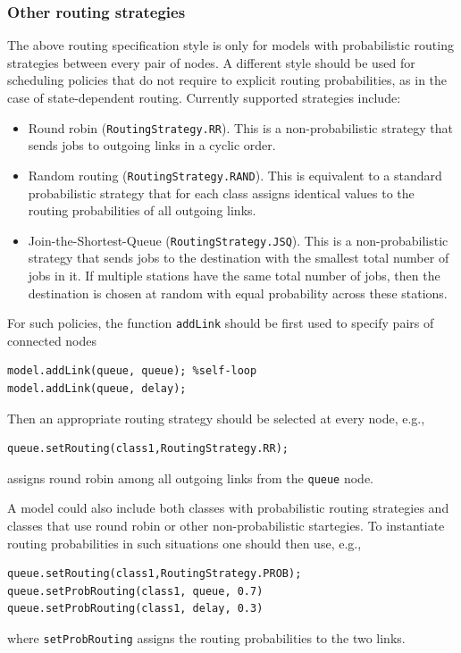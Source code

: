 \subsubsection{Other routing strategies}
The above routing specification style is only for models with probabilistic routing strategies between every pair of nodes. A different style should be used for scheduling policies that do not require to explicit routing probabilities, as in the case of state-dependent routing. Currently supported strategies include:
\begin{itemize}
\item Round robin (\texttt{RoutingStrategy.RR}). This is a non-probabilistic strategy that sends jobs to outgoing links in a cyclic order. %
\item Random routing (\texttt{RoutingStrategy.RAND}). This is equivalent to a standard probabilistic strategy that for each class assigns identical values to the routing probabilities of all outgoing links.
\item Join-the-Shortest-Queue (\texttt{RoutingStrategy.JSQ}).  This is a non-probabilistic strategy that sends jobs to the destination with the smallest total number of jobs in it. If multiple stations have the same total number of jobs, then the destination is chosen at random with equal probability across these stations.
\end{itemize}
For such policies, the function \texttt{addLink} should be first used to specify pairs of connected nodes
\begin{lstlisting}
model.addLink(queue, queue); %self-loop
model.addLink(queue, delay);
\end{lstlisting}
Then an appropriate routing strategy should be selected at every node, e.g.,
\begin{lstlisting}
queue.setRouting(class1,RoutingStrategy.RR);
\end{lstlisting}
assigns round robin among all outgoing links from the \texttt{queue} node.

A model could also include both classes with probabilistic routing strategies and classes that use round robin or other non-probabilistic startegies. To instantiate routing probabilities in such situations one should then use, e.g.,
\begin{lstlisting}
queue.setRouting(class1,RoutingStrategy.PROB);
queue.setProbRouting(class1, queue, 0.7)
queue.setProbRouting(class1, delay, 0.3)
\end{lstlisting}
where \texttt{setProbRouting} assigns the routing probabilities to the two links.

